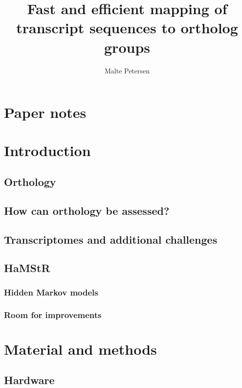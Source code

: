 \documentclass[a4paper,12pt]{scrreprt}
\title{Fast and efficient mapping of transcript sequences to ortholog groups}
\author{Malte Petersen}
\newcommand{\hamstr}{HaMStR\xspace}
\begin{document}
\maketitle
\tableofcontents

\chapter*{Paper notes}
	



\chapter{Introduction}
	
	\section{Orthology}
		
	\section{How can orthology be assessed?}
		
	\section{Transcriptomes and additional challenges}
		
	\section{\hamstr}
		
		\subsection{Hidden Markov models}
			
		\subsection{Room for improvements}

\chapter{Material and methods}
	\section{Hardware}
		
\end{document}
